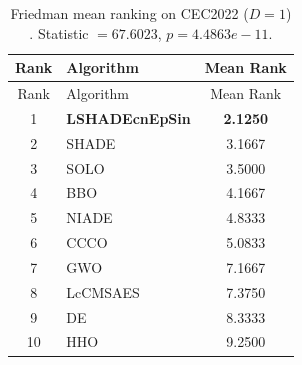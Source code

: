\begin{center}
\small
\renewcommand{\arraystretch}{1.25}
\begin{longtable}{clc}
\caption{Friedman mean ranking on CEC2022 ($D=1$) . Statistic $=67.6023$, $p=4.4863e-11$.}
\label{tab:friedman_CEC2022_1} \\
\toprule
Rank & Algorithm & Mean Rank \\
\midrule
\endfirsthead
\toprule
Rank & Algorithm & Mean Rank \\
\midrule
\endhead
1 & \textbf{LSHADEcnEpSin} & \textbf{2.1250} \\
2 & SHADE & 3.1667 \\
3 & SOLO & 3.5000 \\
4 & BBO & 4.1667 \\
5 & NIADE & 4.8333 \\
6 & CCCO & 5.0833 \\
7 & GWO & 7.1667 \\
8 & LcCMSAES & 7.3750 \\
9 & DE & 8.3333 \\
10 & HHO & 9.2500 \\
\bottomrule
\end{longtable}
\end{center}